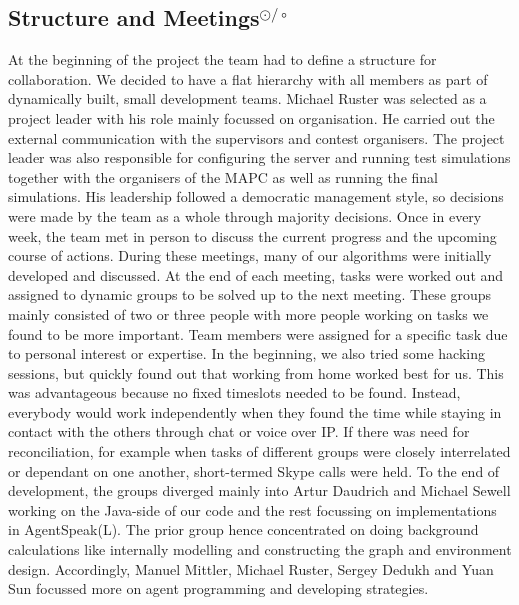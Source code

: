 \subsection[Structure and Meetings]{Structure and Meetings$^{\odot/\circ}$}
At the beginning of the project the team had to define a structure for collaboration.
We decided to have a flat hierarchy with all members as part of dynamically built, small development teams.
Michael Ruster was selected as a project leader with his role mainly focussed on organisation.
He carried out the external communication with the supervisors and contest organisers.
The project leader was also responsible for configuring the server and running test simulations together with the organisers of the MAPC as well as running the final simulations.
His leadership followed a democratic management style, so decisions were made by the team as a whole through majority decisions.
Once in every week, the team met in person to discuss the current progress and the upcoming course of actions.
During these meetings, many of our algorithms were initially developed and discussed.
At the end of each meeting, tasks were worked out and assigned to dynamic groups to be solved up to the next meeting.
These groups mainly consisted of two or three people with more people working on tasks we found to be more important.
Team members were assigned for a specific task due to personal interest or expertise.
In the beginning, we also tried some hacking sessions, but quickly found out that working from home worked best for us.
This was advantageous because no fixed timeslots needed to be found.
Instead, everybody would work independently when they found the time while staying in contact with the others through chat or voice over IP.
If there was need for reconciliation, for example when tasks of different groups were closely interrelated or dependant on one another, short-termed Skype calls were held.
To the end of development, the groups diverged mainly into Artur Daudrich and Michael Sewell working on the Java-side of our code and the rest focussing on implementations in AgentSpeak(L).
The prior group hence concentrated on doing background calculations like internally modelling and constructing the graph and environment design.
Accordingly, Manuel Mittler, Michael Ruster, Sergey Dedukh and Yuan Sun focussed more on agent programming and developing strategies.
